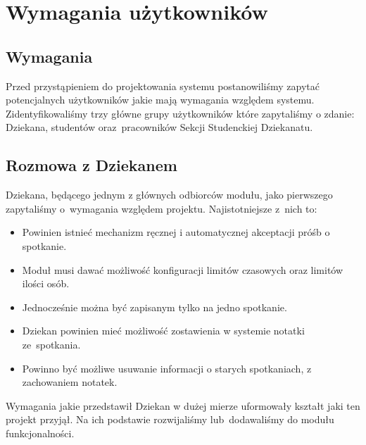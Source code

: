 \documentclass[licencjacka]{pracamgr}
\begin{document}
\chapter{Wymagania użytkowników} \label{chap:wymagania}

\section{Wymagania}
Przed przystąpieniem do projektowania systemu postanowiliśmy zapytać potencjalnych użytkowników jakie mają wymagania względem systemu. Zidentyfikowaliśmy trzy główne grupy użytkowników które zapytaliśmy o zdanie: Dziekana, studentów oraz~pracowników Sekcji Studenckiej Dziekanatu.

\section{Rozmowa z Dziekanem}
Dziekana, będącego jednym z głównych odbiorców modułu, jako pierwszego zapytaliśmy o~wymagania względem projektu. Najistotniejsze z~nich to:

\begin{itemize}
\setlength\itemsep{0,05em}
\item Powinien istnieć mechanizm ręcznej i automatycznej akceptacji próśb o spotkanie.
\item Moduł musi dawać możliwość konfiguracji limitów czasowych oraz limitów ilości osób.
\item Jednocześnie można być zapisanym tylko na jedno spotkanie.
\item Dziekan powinien mieć możliwość zostawienia w systemie notatki ze~spotkania.
\item Powinno być możliwe usuwanie informacji o starych spotkaniach, z zachowaniem notatek.
\end{itemize}
Wymagania jakie przedstawił Dziekan w dużej mierze uformowały kształt jaki ten projekt przyjął. Na ich podstawie rozwijaliśmy lub~dodawaliśmy do modułu funkcjonalności.
\end{document}
